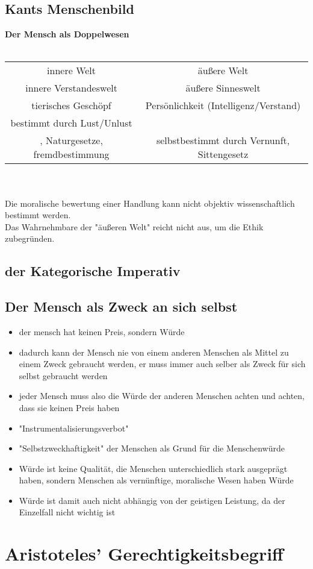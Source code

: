 \documentclass[12pt, letterpaper]{article}
\begin{document}
\subsection{Kants Menschenbild}
\label{sec:Kants Menschenbild}
\textbf{Der Mensch als Doppelwesen}	
\\\\
\begin{tabular}{ c| c }
	innere Welt & äußere Welt\\
	innere Verstandeswelt& äußere Sinneswelt\\
	\hline
	tierisches Geschöpf& Persönlichkeit (Intelligenz/Verstand)\\
	\hline
	bestimmt durch Lust/Unlust\\, Naturgesetze, fremdbestimmung& selbstbestimmt durch Vernunft, Sittengesetz
\end{tabular}
\\\\
Die moralische bewertung einer Handlung kann nicht objektiv wissenschaftlich bestimmt werden.\\
Das Wahrnehmbare der "äußeren Welt" reicht nicht  aus, um die Ethik zubegründen. 
	

\subsection{der Kategorische Imperativ}
\label{sec:der Kategorische Imperativ}

\label{sec:Kant}
\subsection{Der Mensch als Zweck an sich selbst}
\label{sec:Der Mensch als Zweck an sich selbst}
\begin{itemize}
	\item der mensch hat keinen Preis, sondern Würde
	\item dadurch kann der Mensch nie von einem anderen Menschen als Mittel zu einem Zweck gebraucht werden, er muss immer auch selber als Zweck für sich selbst gebraucht werden	
	\item jeder Mensch muss also die Würde der anderen Menschen achten und achten, dass sie keinen Preis haben  
	\item "Instrumentalisierungsverbot"
	\item "Selbstzweckhaftigkeit" der Menschen als Grund für die Menschenwürde
	\item Würde ist keine Qualität, die Menschen unterschiedlich stark ausgeprägt haben, sondern Menschen als vernünftige, moralische Wesen haben Würde
	\item Würde ist damit auch nicht abhängig von der geistigen Leistung, da der Einzelfall nicht wichtig ist

		

\end{itemize}
\newpage
\section{Aristoteles' Gerechtigkeitsbegriff}
\label{sec:Aristoteles' Gerechtigkeitsbegriff}
\end{document}
